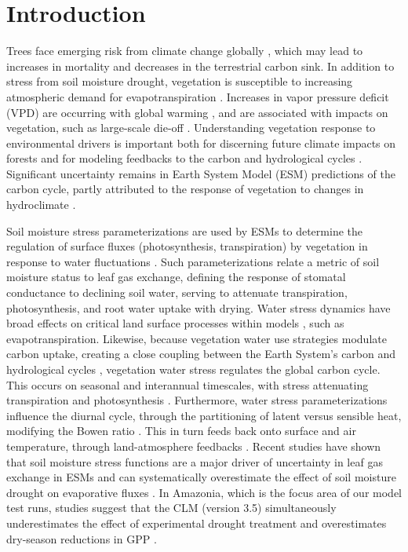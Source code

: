 \documentclass[draft,linenumbers]{agujournal}
\begin{document}
\section{Introduction}

Trees face emerging risk from climate change globally \citep{allen2010,anderegg2013b}, which may lead to increases in mortality and decreases in the terrestrial carbon sink.
In addition to stress from soil moisture drought, vegetation is susceptible to increasing atmospheric demand for evapotranspiration \citep{restaino2016,novick2016b,lemordant2018}.
Increases in vapor pressure deficit (VPD) are occurring with global warming \citep{ficklin2017,seager2015}, and are associated with impacts on vegetation, such as large-scale die-off \citep{williams2013,mcdowell2015}.
Understanding vegetation response to environmental drivers is important both for discerning future climate impacts on forests and for modeling feedbacks to the carbon and hydrological cycles \citep{lemordant2018}.
Significant uncertainty remains in Earth System Model (ESM) predictions of the carbon cycle, partly attributed to the response of vegetation to changes in hydroclimate \citep{dekauwe2017,friedlingstein2014,trugman2018}.

Soil moisture stress parameterizations are used by ESMs to determine the regulation of surface fluxes (photosynthesis, transpiration) by vegetation in response to water fluctuations \citep{egea2011,verhoef2014}.
Such parameterizations relate a metric of soil moisture status to leaf gas exchange, defining the response of stomatal conductance to declining soil water, serving to attenuate transpiration, photosynthesis, and root water uptake with drying.
Water stress dynamics have broad effects on critical land surface processes within models \citep{joetzjer2014}, such as evapotranspiration.
Likewise, because vegetation water use strategies modulate carbon uptake, creating a close coupling between the Earth System's carbon and hydrological cycles \citep{green2017}, vegetation water stress regulates the global carbon cycle.
This occurs on seasonal and interannual timescales, with stress attenuating transpiration \citep{dekauwe2015} and photosynthesis \citep{stocker2018}.
Furthermore, water stress parameterizations influence the diurnal cycle, through the partitioning of latent versus sensible heat, modifying the Bowen ratio \citep{gentine2007,gentine2011}. 
This in turn feeds back onto surface and air temperature, through land-atmosphere feedbacks \citep{bonan2008,seneviratne2006}.
Recent studies have shown that soil moisture stress functions are a major driver of uncertainty in leaf gas exchange in ESMs \citep{trugman2018} and can systematically overestimate the effect of soil moisture drought on evaporative fluxes \citep{ukkola2016,bonan2014}.
In Amazonia, which is the focus area of our model test runs, studies suggest that the CLM (version 3.5) simultaneously underestimates the effect of experimental drought treatment \citep{powell2013} and overestimates dry-season reductions in GPP \citep{restrepo2017}.
\end{document}
